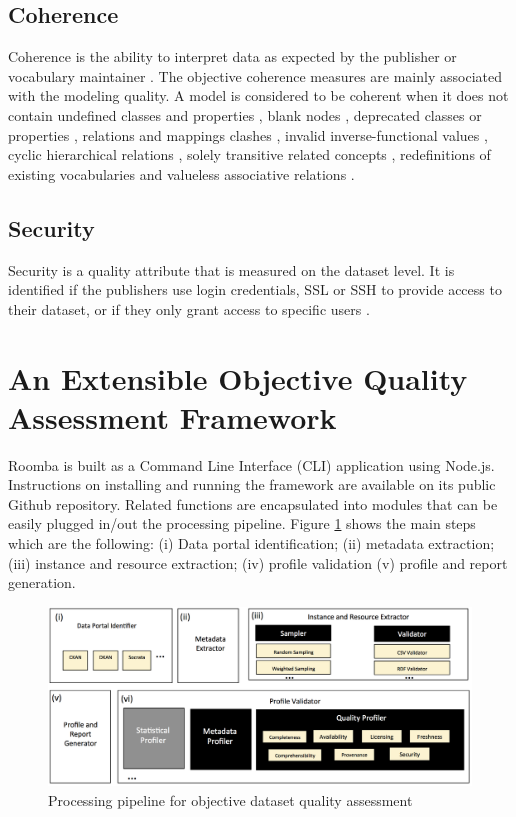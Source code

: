 \documentclass[onecolumn, crcready]{iosart2c}
\begin{document}
\subsection{Coherence}

Coherence is the ability to interpret data as expected by the publisher or vocabulary maintainer \cite{Hogan2010}. The objective coherence measures are mainly associated with the modeling quality. A model is considered to be coherent when it does not contain undefined classes and properties \cite{Hogan2010}, blank nodes \cite{Hogan:2012:ESL:2263498.2264570}, deprecated classes or properties \cite{Hogan2010}, relations and mappings clashes \cite{Suominen:2012:IQS:2413941.2413985}, invalid inverse-functional values \cite{Hogan2010}, cyclic hierarchical relations \cite{conf/jcdl/Soergel05}\cite{Suominen:2012:IQS:2413941.2413985}\cite{Mader2012}, solely transitive related concepts \cite{Mader2012}, redefinitions of existing vocabularies \cite{Hogan2010} and valueless associative relations \cite{Mader2012}.

\subsection{Security}

Security is a quality attribute that is measured on the dataset level. It is identified if the publishers use login credentials, SSL or SSH to provide access to their dataset, or if they only grant access to specific users \cite{Framework2012}.

\section{An Extensible Objective Quality Assessment Framework}

Roomba is built as a Command Line Interface (CLI) application using Node.js. Instructions on installing and running the framework are available on its public Github repository. Related functions are encapsulated into modules that can be easily plugged in/out the processing pipeline. Figure \ref{fig:1} shows the main steps which are the following: (i) Data portal identification; (ii) metadata extraction; (iii) instance and resource extraction; (iv) profile validation (v) profile and report generation.

\begin{figure}[!ht]
  \centering
    \includegraphics[scale=0.4]{figure-1_architecture.png}
  \caption{Processing pipeline for objective dataset quality assessment}
  \label{fig:1}
\end{figure}
\end{document}
